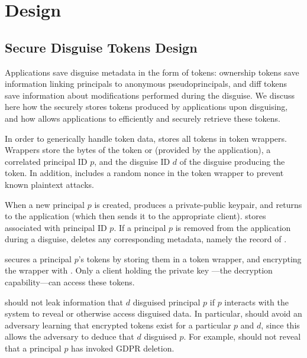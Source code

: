 \section{Design} 

\subsection{Secure Disguise Tokens Design} 
Applications save disguise metadata in the form of tokens: ownership tokens  save information linking
principals to anonymous pseudoprincipals, and diff tokens  save information about modifications
performed during the disguise. 
We discuss here how the \sys securely stores tokens produced by applications upon disguising, and
how \sys allows applications to efficiently and securely retrieve these tokens.

In order to generically handle token data, \sys stores all tokens in token wrappers. 
Wrappers store the bytes of the token  or  (provided
by the application), a correlated principal ID $p$, and the disguise ID $d$ of the disguise producing the
token. In addition, \sys includes a random nonce in the token wrapper to prevent known plaintext
attacks.

When a new principal $p$ is created, \sys produces a private-public keypair, and returns  to
the application (which then sends it to the appropriate client). \sys stores  associated
with principal ID $p$.
If a principal $p$ is removed from the application during a disguise, \sys deletes any corresponding metadata, namely
the record of .

\sys secures a principal $p$'s tokens by storing them in a token wrapper, and encrypting the wrapper
with . Only a client holding the private key ---the decryption
capability---can access these tokens.

\sys should not leak information that $d$ disguised principal $p$ if $p$ interacts with the system
to reveal or otherwise access disguised data. In particular, \sys should avoid an adversary learning
that encrypted tokens exist for a particular $p$ and $d$, since this allows the adversary to deduce
that $d$ disguised $p$. For example, \sys should not reveal that a principal $p$ has invoked GDPR
deletion.

